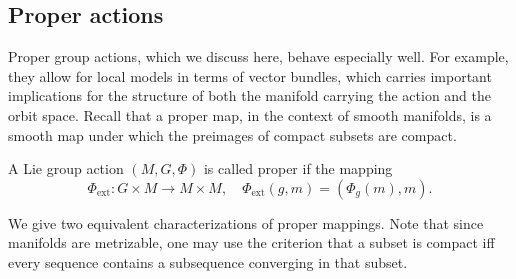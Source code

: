\subsection{Proper actions}


Proper group actions, which we discuss here, behave especially well. For example, they allow for local models in terms of vector bundles, which carries important implications for the structure of both the manifold carrying the action and the orbit space. Recall that a proper map, in the context of smooth manifolds, is a smooth map under which the preimages of compact subsets are compact.

\begin{defn}
    A Lie group action $(M,G,\Phi)$ is called proper if the mapping 
    \[\Phi_{\mathrm{ext}}:G\times M\to M\times M,\quad \Phi_{\mathrm{ext}}(g,m)=\left(\Phi_g(m),m\right).\]
\end{defn}

We give two equivalent characterizations of proper mappings. Note that since manifolds are metrizable, one may use the criterion that a subset is compact iff every sequence contains a subsequence converging in that subset.

